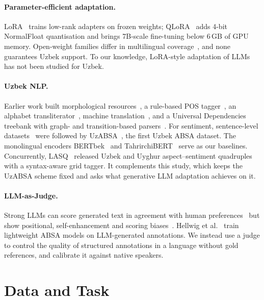 \documentclass[runningheads]{llncs}
\begin{document}
\paragraph{Parameter-efficient adaptation.} LoRA~\cite{Hu2021-fz} trains low-rank adapters on frozen weights; QLoRA~\cite{3666122.3666563} adds 4-bit NormalFloat quantisation and brings 7B-scale fine-tuning below 6\,GB of GPU memory. Open-weight families differ in multilingual coverage~\cite{Touvron2023-lf,Grattafiori2024-ka,Qwen2024-kr}, and none guarantees Uzbek support. To our knowledge, LoRA-style adaptation of LLMs has not been studied for Uzbek.

\paragraph{Uzbek NLP.} Earlier work built morphological resources~\cite{Matlatipov2009,10.1007/978-3-030-63119-2_59,Salaev2024}, a rule-based POS tagger~\cite{Sharipov2023-ud}, an alphabet transliterator~\cite{salaev2022translit}, machine translation~\cite{10.1007/978-3-031-05328-3_6}, and a Universal Dependencies treebank with graph- and transition-based parsers~\cite{MATLATIPOV2026112857,11632281,10.1007/978-3-032-29532-3_15}. For sentiment, sentence-level datasets~\cite{proceedings2019021037,kuriyozov2022construction,Matlatipov2022-yd} were followed by UzABSA~\cite{matlatipov-etal-2024-uzabsa}, the first Uzbek ABSA dataset. The monolingual encoders BERTbek~\cite{kuriyozov-etal-2024-bertbek} and TahrirchiBERT~\cite{tahrirchibert2023} serve as our baselines. Concurrently, LASQ~\cite{Yusufu2026} released Uzbek and Uyghur aspect--sentiment quadruples with a syntax-aware grid tagger. It complements this study, which keeps the UzABSA scheme fixed and asks what generative LLM adaptation achieves on it.

\paragraph{LLM-as-Judge.} Strong LLMs can score generated text in agreement with human preferences~\cite{3666122.3668142} but show positional, self-enhancement and scoring biases~\cite{2506.22316}. Hellwig et al.~\cite{hellwig-etal-2026-llm} train lightweight ABSA models on LLM-generated annotations. We instead use a judge to control the quality of structured annotations in a language without gold references, and calibrate it against native speakers.

\section{Data and Task}
\label{sec:data}
\end{document}
